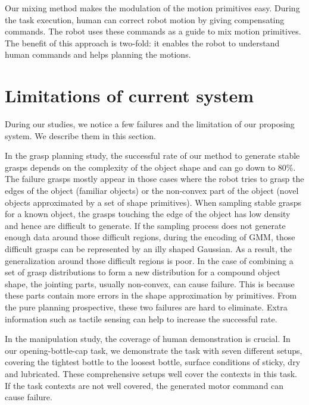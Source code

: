 Our mixing method makes the modulation of the motion primitives easy. During the task execution, human can correct robot motion by giving compensating commands. The robot uses these commands as a guide to mix motion primitives. The benefit of this approach is two-fold: it enables the robot to understand human commands and helps planning the motions.



\section{Limitations of current system}
\label{cha6:sec2}



During our studies, we notice a few failures and the limitation of our proposing system. We describe them in this section.


In the grasp planning study, the successful rate of our method to generate stable grasps depends on the complexity of the object shape and can go down to 80$\%$. The failure grasps mostly appear in those cases where the robot tries to grasp the edges of the object (familiar objects) or the non-convex part of the object (novel objects approximated by a set of shape primitives). When sampling stable grasps for a known object, the grasps touching the edge of the object has low density and hence are difficult to generate. If the sampling process does not generate enough data around those difficult regions, during the encoding of GMM, those difficult grasps can be represented by an illy shaped Gaussian. As a result, the generalization around those difficult regions is poor. In the case of combining a set of grasp distributions to form a new distribution for a compound object shape, the jointing parts, usually non-convex, can cause failure. This is because these parts contain more errors in the shape approximation by primitives. From the pure planning prospective, these two failures are hard to eliminate. Extra information such as tactile sensing can help to increase the successful rate.

In the manipulation study, the coverage of human demonstration is crucial. In our opening-bottle-cap task, we demonstrate the task with seven different setups, covering the tightest bottle to the loosest bottle, surface conditions of sticky, dry and lubricated. These comprehensive setups well cover the contexts in this task. If the task contexts are not well covered, the generated motor command can cause failure.

